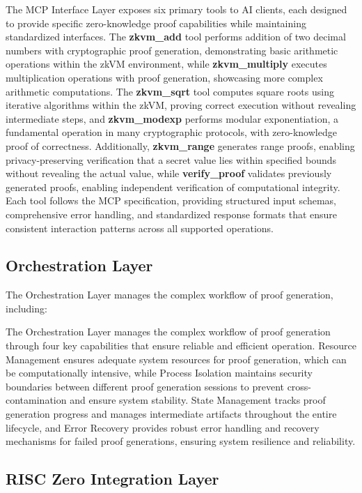 \documentclass[11pt]{article}
\begin{document}
The MCP Interface Layer exposes six primary tools to AI clients, each designed to provide specific zero-knowledge proof capabilities while maintaining standardized interfaces. The \textbf{zkvm\_add} tool performs addition of two decimal numbers with cryptographic proof generation, demonstrating basic arithmetic operations within the zkVM environment, while \textbf{zkvm\_multiply} executes multiplication operations with proof generation, showcasing more complex arithmetic computations. The \textbf{zkvm\_sqrt} tool computes square roots using iterative algorithms within the zkVM, proving correct execution without revealing intermediate steps, and \textbf{zkvm\_modexp} performs modular exponentiation, a fundamental operation in many cryptographic protocols, with zero-knowledge proof of correctness. Additionally, \textbf{zkvm\_range} generates range proofs, enabling privacy-preserving verification that a secret value lies within specified bounds without revealing the actual value, while \textbf{verify\_proof} validates previously generated proofs, enabling independent verification of computational integrity. Each tool follows the MCP specification, providing structured input schemas, comprehensive error handling, and standardized response formats that ensure consistent interaction patterns across all supported operations.

\subsection{Orchestration Layer}

The Orchestration Layer manages the complex workflow of proof generation, including:

The Orchestration Layer manages the complex workflow of proof generation through four key capabilities that ensure reliable and efficient operation. Resource Management ensures adequate system resources for proof generation, which can be computationally intensive, while Process Isolation maintains security boundaries between different proof generation sessions to prevent cross-contamination and ensure system stability. State Management tracks proof generation progress and manages intermediate artifacts throughout the entire lifecycle, and Error Recovery provides robust error handling and recovery mechanisms for failed proof generations, ensuring system resilience and reliability.

\subsection{RISC Zero Integration Layer}
\end{document}
